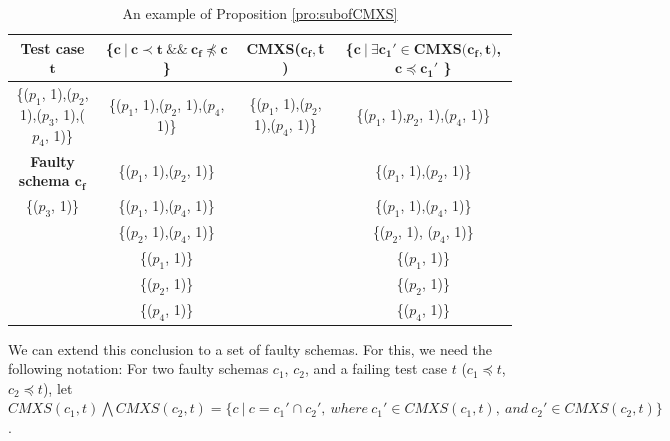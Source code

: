 \documentclass{sig-alternate-05-2015}
\begin{document}
\begin{table}[ht]
  \centering
  \setlength{\tabcolsep}{3pt}
  \caption{An example of Proposition \ref{pro:subofCMXS}}
    \begin{tabular}{|c|c|c|c|}
    \hline
  \textbf{  Test case $\textbf{t}$} & \textbf{ \{$\textbf{c}\ |\ \textbf{c} \prec \textbf{t}\ \&\&\ \textbf{c}_{\textbf{f}} \npreceq \textbf{c}$\} }& \textbf{ CMXS($\textbf{c}_{\textbf{f}}, $\textbf{t}$ $)} & \textbf{\{$ \textbf{c}\ |\ \exists \textbf{c}_{\textbf{1}}' \in \textbf{CMXS}\textbf{(}\textbf{c}_{\textbf{f}}, \textbf{t}\textbf{)}$, $\textbf{c} \preceq \textbf{c}_{\textbf{1}}'$ \}}\\\hline
    \{($p_{1}$, 1),($p_{2}$, 1),($p_{3}$, 1),($p_{4}$, 1)\}  & \{($p_{1}$, 1),($p_{2}$, 1),($p_{4}$, 1)\} & \{($p_{1}$, 1),($p_{2}$, 1),($p_{4}$, 1)\} & \{($p_{1}$, 1),$p_{2}$, 1),($p_{4}$, 1)\}\\ \cline{1-1}
      \textbf{Faulty schema $\textbf{c}_{\textbf{f}}$}  & \{($p_{1}$, 1),($p_{2}$, 1)\} &  & \{($p_{1}$, 1),($p_{2}$, 1)\} \\\cline{1-1}
     \{($p_{3}$, 1)\}         & \{($p_{1}$, 1),($p_{4}$, 1)\}&  &\{($p_{1}$, 1),($p_{4}$, 1)\}\\
          &       \{($p_{2}$, 1),($p_{4}$, 1)\} &  &\{($p_{2}$, 1), ($p_{4}$, 1)\}\\
          &       \{($p_{1}$, 1)\} &  &\{($p_{1}$, 1)\}\\
          &       \{($p_{2}$, 1)\} &  &\{($p_{2}$, 1)\}\\
          &       \{($p_{4}$, 1)\} &  & \{($p_{4}$, 1)\}\\\hline
    \end{tabular}%
  \label{examleOfCMXSPro}%
\end{table}%

%


We can extend this conclusion to a set of faulty schemas. For this, we need the following notation: For two faulty schemas $c_{1}$, $c_{2}$, and a failing test case $t$ ($c_{1} \preceq t$, $c_{2} \preceq t$), let $CMXS(c_{1}, t) \bigwedge CMXS(c_{2}, t)  = \{ c\ |\ c = c_{1}' \cap c_{2}',\ where\ c_{1}' \in CMXS(c_{1}, t),\ and\ c_{2}' \in CMXS(c_{2}, t) \}$.
\end{document}
